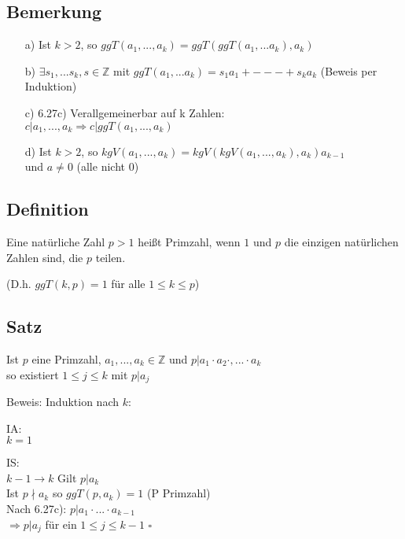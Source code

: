 \documentclass[a4paper, 12pt, twoside] {article}
\begin{document}
\subsection{Bemerkung} %

\begin{itemize}

\item[a)] Ist $k > 2$, so $ggT(a_1, ..., a_k) = ggT(ggT(a_1, ...a_k), a_k)$

\item[b)] $\exists s_1, ... s_k, s \in \mathbb{Z}$ mit $ggT(a_1, ... a_k) = s_1 a_1 + --- + s_k a_k$ (Beweis per Induktion)

\item[c)] 6.27c) Verallgemeinerbar auf k Zahlen: \\
$c | a_1, ... , a_k \Rightarrow c | ggT(a_1, ... , a_k)$

\item[d)] Ist $k > 2$, so $kgV(a_1, ... , a_k) = kgV(kgV(a_1, ..., a_k), a_k) a_{k-1}$ \\
und $a \neq 0$ (alle nicht 0)

\end{itemize}

\subsection[Definition (Primzahl)]{Definition} %
Eine natürliche Zahl $p > 1$ heißt Primzahl, wenn $1$ und $p$ die einzigen natürlichen Zahlen sind,
die $p$ teilen.

(D.h. $ggT(k, p) = 1$ für alle $1 \leq k \leq p$)

\subsection{Satz} %
Ist $p$ eine Primzahl, $a_1, ... ,a_k \in \mathbb{Z}$ und $p | a_1 \cdot a_2 \cdot, ... \cdot a_k$ \\
so existiert $1 \leq j \leq k$ mit $p | a_j$

Beweis: Induktion nach $k$:

IA: \\
$k = 1$ \checkmark

IS: \\
$k -1 \rightarrow k$ Gilt $p | a_k$ \checkmark \\
Ist $p \nmid a_k$ so $ggT(p, a_k) = 1$ (P Primzahl) \\
Nach 6.27c): $p | a_1 \cdot ... \cdot a_{k-1}$ \\
$\Rightarrow p | a_j$ für ein $1 \leq j \leq k - 1$ \hfill $\square$
\end{document}
